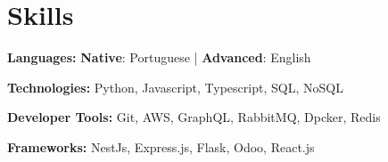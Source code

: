 \documentclass[a4paper,10pt]{article}
\begin{document}
\section*{Skills}
\vspace{0.6em}
\item \textbf{Languages:} \textbf{Native}: Portuguese | \textbf{Advanced}: English
\item \textbf{Technologies:} Python, Javascript, Typescript, SQL, NoSQL
\item \textbf{Developer Tools:} Git, AWS, GraphQL, RabbitMQ, Dpcker, Redis
\item \textbf{Frameworks:} NestJs, Express.js, Flask, Odoo, React.js
\end{document}
